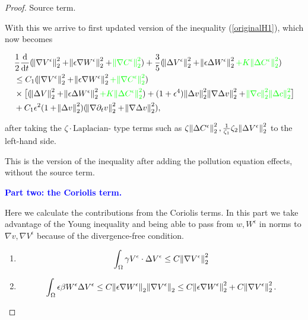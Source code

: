 \documentclass[11pt]{article}
\newcommand*\diff{\mathop{}\!\mathrm{d}}
\begin{document}
\begin{proof}
Source  term.

With this we arrive to first updated version of the inequality (\ref{originalH1}), which now becomes

\begin{equation}
  \begin{split}
    & \frac{1}{2} \frac{\diff}{\diff t} (\norm{\nabla V^\epsilon}^2_2 + \norm{\epsilon \nabla W^\epsilon}^2_2 + \textcolor{green}{\norm{\nabla C^\epsilon}^2_2}) + \frac{3}{5} (\norm{\Delta V^\epsilon}^2_2 + \norm{\epsilon \Delta W^\epsilon}^2_2 \textcolor{green}{+ K \norm{\Delta C^\epsilon}_2^2}) \\
    & \leq C_1 (\norm{\nabla V^\epsilon}^2_2 + \norm{\epsilon \nabla W^\epsilon}^2_2 \textcolor{green}{+ \norm{\nabla C^\epsilon}^2_2}) \\
    & \times \big [ (\norm{\Delta V}^2_2 + \norm{\epsilon \Delta W^\epsilon}^2_2 \textcolor{green}{+ K \norm{\Delta C^\epsilon}_2^2}) + (1+ \epsilon^4) \norm{\Delta v}^2_2 \norm{\nabla \Delta v}^2_2 + \textcolor{green}{\norm{\nabla c}^2_2 \norm{\Delta c}^2_2} \big ] \\
    & + C_1 \epsilon^2 (1 + \norm{\Delta v}^2_2) (\norm{\nabla \partial_t v}^2_2 + \norm{\nabla \Delta v}^2_2),
  \end{split}
\end{equation}

after taking the $\zeta \cdot \text{Laplacian}$- type terms such as $\zeta \norm{\Delta C^\epsilon}_2^2, \frac{1}{\zeta_1} \zeta_2 \norm{\Delta V^\epsilon}_2^2$ to the left-hand side.

This is the  version of the inequality after adding the pollution equation effects, without the source term.

\textcolor{blue}{\textbf{Part two: the Coriolis term.}}

Here we calculate the contributions from the Coriolis terms. In this part we take advantage of the Young inequality and being able to pass from $w, W^\epsilon$ in norms to $\nabla v, \nabla V^\epsilon$ because of the divergence-free condition.

\begin{enumerate}

  \item $$\int_\Omega \gamma V^\epsilon \cdot \Delta V^\epsilon \leq C \norm{\nabla V^\epsilon}^2_2$$
  
  \item $$ \int_\Omega \epsilon \beta W^\epsilon \Delta V^\epsilon \leq C \norm{\epsilon \nabla W^\epsilon}_2 \norm{\nabla V^\epsilon}_2 \leq C \norm{\epsilon \nabla W^\epsilon}^2_2 + C \norm{\nabla V^\epsilon}^2_2.$$
  

\end{enumerate}
\end{proof}
\end{document}
